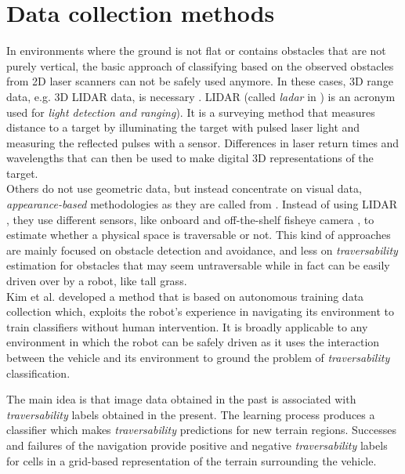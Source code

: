 \documentclass[12pt,a4paper]{report}
\newcommand{\term}{\textit}
\newcommand{\acronym}{\MakeUppercase}
\begin{document}
	\section{Data collection methods}
	\label{sec:bg:data}
	
	In environments where the ground is not flat or contains obstacles that are 
	not purely vertical, the basic approach of classifying based on the observed 
	obstacles from \acronym{2d} laser scanners can not be safely used anymore. 
	In these cases, \acronym{3d} range data, e.g. \acronym{3d} \acronym{lidar} 
	data, is necessary \cite{Suger, Lalonde}. \acronym{lidar} (called \term{ladar} 
	in \cite{Lalonde}) is an acronym used for \term{light detection and ranging}). 
	It is a surveying method that measures distance to a target by illuminating 
	the target with pulsed laser light and measuring the reflected pulses with a 
	sensor. Differences in laser return times and wavelengths that can then be 
	used to make digital \acronym{3d} representations of the target.
	\\
	
	Others do not use geometric data, but instead concentrate on visual data, 
	\term{appearance-based} methodologies as they are called from \cite{Papadakis}. 
	Instead of using \acronym{lidar} \cite{Lalonde, Suger}, they use different 
	sensors, like onboard and off-the-shelf fisheye camera \cite{Hirose}, to 
	estimate whether a physical space is traversable or not. This kind of 
	approaches are mainly focused on obstacle detection and avoidance, and less 
	on \term{traversability} estimation for obstacles that may seem untraversable while 
	in fact can be easily driven over by a robot, like tall grass.
	\\
	
	
	
	
	
	Kim et al. \cite{Kim} developed a method 
	that is based on autonomous training data collection which, exploits the 
	robot’s experience in navigating its environment to train classifiers without 
	human intervention. It is broadly applicable to any environment in which 
	the robot can be safely driven as it uses the interaction between the vehicle
	and its environment to ground the problem of \term{traversability} classification.
	
	The main idea is that image data  obtained in the past is associated with 
	\term{traversability} labels obtained in the  present. The learning process produces a 
	classifier which makes \term{traversability}  predictions for new terrain regions. 
	Successes and failures of the navigation provide positive and negative 
	\term{traversability} labels for cells in a grid-based representation of the terrain surrounding 
	the vehicle.
	
\end{document}
